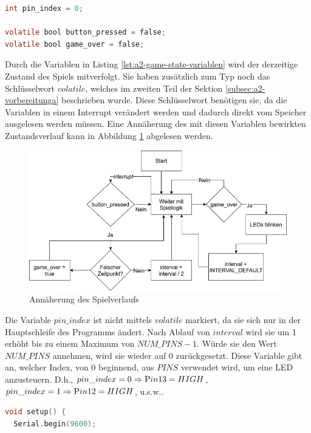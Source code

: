 \begin{lstlisting}[language=C,label={lst:a2-game-state-variablen}, caption={Variablen zur Zustandsbestimmung des Spiels}]
int pin_index = 0;

volatile bool button_pressed = false;
volatile bool game_over = false;
\end{lstlisting}

Durch die Variablen in Listing \ref{lst:a2-game-state-variablen} wird der derzeitige Zustand des Spiels mitverfolgt.
Sie haben zusätzlich zum Typ noch das Schlüsselwort $volatile$, welches im zweiten Teil der Sektion \ref{subsec:a2-vorbereitunga} beschrieben wurde.
Diese Schlüsselwort benötigen sie, da die Variablen in einem Interrupt verändert werden und dadurch direkt vom Speicher ausgelesen werden müssen.
Eine Annäherung des mit diesen Variablen bewirkten Zustandsverlauf kann in Abbildung \ref{fig:annäherung-des-spielverlaufs} abgelesen werden.

\begin{figure}[ht]
    \centering
    \includegraphics[width=\textwidth]{pictures/a2-game-state.png}
    \caption{Annäherung des Spielverlaufs}
    \label{fig:annäherung-des-spielverlaufs}
\end{figure}


Die Variable $pin\_index$ ist nicht mittels $volatile$ markiert, da sie sich nur in der Hauptschleife des Programms ändert.
Nach Ablauf von $interval$ wird sie um 1 erhöht bis zu einem Maximum von $NUM\_PINS - 1$.
Würde sie den Wert $NUM\_PINS$ annehmen, wird sie wieder auf 0 zurückgesetzt.
Diese Variable gibt an, welcher Index, von 0 beginnend, aus $PINS$ verwendet wird, um eine LED anzusteuern.
D.h., $pin\_index = 0 \Rightarrow \text Pin13 = HIGH$, $pin\_index = 1 \Rightarrow \text Pin12 = HIGH$, u.s.w..

\begin{lstlisting}[language=C,label={lst:a2-serial-begin}, caption={Einstellen der seriellen Schnittstelle}]
void setup() {
  Serial.begin(9600);
\end{lstlisting}




